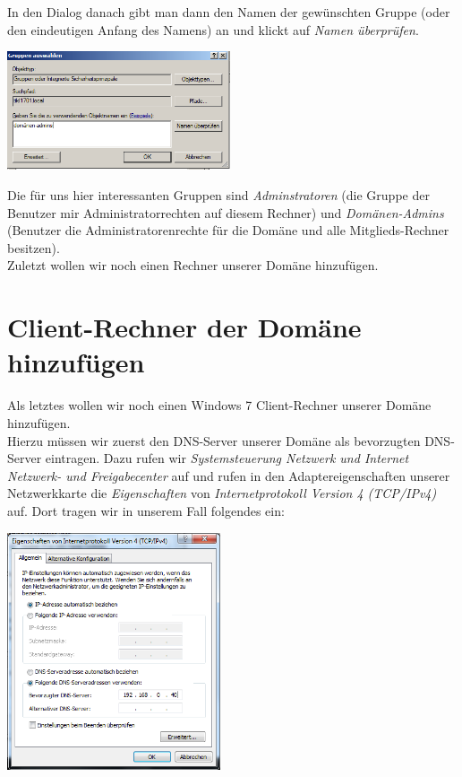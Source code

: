 \documentclass[12pt,a4paper,titlepage]{scrartcl} %
\begin{document}
In den Dialog danach gibt man dann den Namen der gewünschten Gruppe (oder den eindeutigen Anfang des Namens) an und klickt auf \emph{Namen überprüfen}.\\
	
	\begin{center}\includegraphics[height=3.5cm]{Bilder/053}\\ \end{center}
	
Die für uns hier interessanten Gruppen sind \emph{Adminstratoren} (die Gruppe der Benutzer mir Administratorrechten auf diesem Rechner) und \emph{Domänen-Admins} (Benutzer die Administratorenrechte für die Domäne und alle Mitglieds-Rechner besitzen).\\
Zuletzt wollen wir noch einen Rechner unserer Domäne hinzufügen.

\newpage
\section{Client-Rechner der Domäne hinzufügen}
Als letztes wollen wir noch einen Windows 7 Client-Rechner unserer Domäne hinzufügen.\\
Hierzu müssen wir zuerst den DNS-Server unserer Domäne als bevorzugten DNS-Server eintragen. Dazu rufen wir \emph{Systemsteuerung  Netzwerk und Internet  Netzwerk- und Freigabecenter} auf und rufen in den Adaptereigenschaften unserer Netzwerkkarte die \emph{Eigenschaften} von \emph{Internetprotokoll Version 4 (TCP/IPv4)} auf. Dort tragen wir in unserem Fall folgendes ein:\\

	\begin{center}\includegraphics[height=7cm]{Bilder/Client/Client01}\\ \end{center}
	
\end{document}
